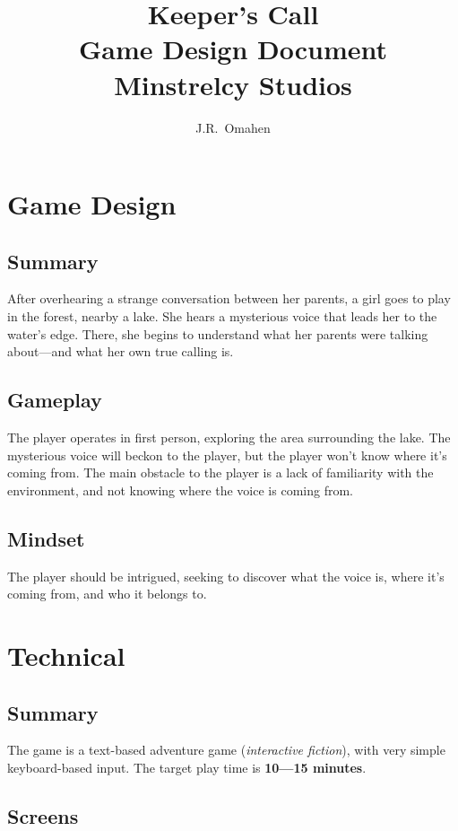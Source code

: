 \documentclass[letterpaper, twoside, 12pt]{memoir}
\title{{\HUGE Keeper's Call}\\
{\small Game Design Document}
\vspace{\fill} \\ 
Minstrelcy Studios
\vspace{\fill} \\ 
}
\author{J.R.~Omahen}
\begin{document}
\maketitle
\newpage

\tableofcontents

\chapter{Game Design}
\section{Summary}

After overhearing a strange conversation between her parents, a girl goes to play in the forest, nearby a lake. She hears a mysterious voice that leads her to the water’s edge. There, she begins to understand what her parents were talking about---and what her own true calling is.

\section{Gameplay}

The player operates in first person, exploring the area surrounding the lake. The mysterious voice will beckon to the player, but the player won't know where it's coming from. The main obstacle to the player is a lack of familiarity with the environment, and not knowing where the voice is coming from. 

\section{Mindset}

The player should be intrigued, seeking to discover what the voice is, where it's coming from, and who it belongs to.

\chapter{Technical}
\section{Summary}

The game is a text-based adventure game (\textit{interactive fiction}), with very simple keyboard-based input. The target play time is \textbf{10---15 minutes}.

\section{Screens}
\end{document}

